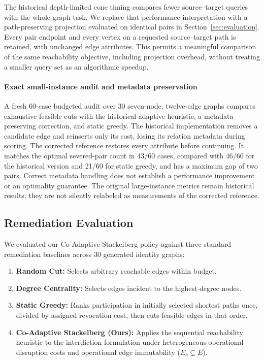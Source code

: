 The historical depth-limited cone timing compares fewer source--target queries with the whole-graph task. We replace that performance interpretation with a path-preserving projection evaluated on identical pairs in Section~\ref{sec:evaluation}. Every pair endpoint and every vertex on a requested source--target path is retained, with unchanged edge attributes. This permits a meaningful comparison of the same reachability objective, including projection overhead, without treating a smaller query set as an algorithmic speedup.

\paragraph{Exact small-instance audit and metadata preservation}
A fresh 60-case budgeted audit over 30 seven-node, twelve-edge graphs compares exhaustive feasible cuts with the historical adaptive heuristic, a metadata-preserving correction, and static greedy. The historical implementation removes a candidate edge and reinserts only its cost, losing its relation metadata during scoring. The corrected reference restores every attribute before continuing. It matches the optimal severed-pair count in 43/60 cases, compared with 46/60 for the historical version and 21/60 for static greedy, and has a maximum gap of two pairs. Correct metadata handling does not establish a performance improvement or an optimality guarantee. The original large-instance metrics remain historical results; they are not silently relabeled as measurements of the corrected reference.

\subsection{Remediation Evaluation}
We evaluated our Co-Adaptive Stackelberg policy against three standard remediation baselines across 30 generated identity graphs:
\begin{enumerate}
    \item \textbf{Random Cut:} Selects arbitrary reachable edges within budget.
    \item \textbf{Degree Centrality:} Selects edges incident to the highest-degree nodes.
    \item \textbf{Static Greedy:} Ranks participation in initially selected shortest paths once, divided by assigned revocation cost, then cuts feasible edges in that order.
    \item \textbf{Co-Adaptive Stackelberg (Ours):} Applies the sequential reachability heuristic to the interdiction formulation under heterogeneous operational disruption costs and operational edge immutability ($E_b \subsetneq E$).
\end{enumerate}

